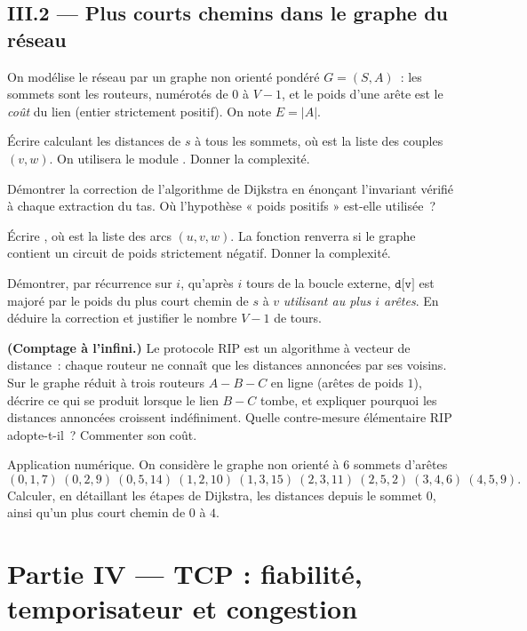 \documentclass[11pt,a4paper]{article}
\begin{document}
\subsection*{III.2 --- Plus courts chemins dans le graphe du réseau}

On modélise le réseau par un graphe non orienté pondéré $G=(S,A)$~: les sommets sont les
routeurs, numérotés de $0$ à $V-1$, et le poids d'une arête est le \emph{coût} du lien
(entier strictement positif). On note $E=|A|$.

\Q Écrire  calculant les distances de $s$ à tous les sommets, où
 est la liste des couples $(v,w)$. On utilisera le module . Donner
la complexité.

\Q Démontrer la correction de l'algorithme de Dijkstra en énonçant l'invariant vérifié à
chaque extraction du tas. Où l'hypothèse « poids positifs » est-elle utilisée~?

\Q Écrire , où  est la liste des arcs
$(u,v,w)$. La fonction renverra  si le graphe contient un circuit de poids
strictement négatif. Donner la complexité.

\Q Démontrer, par récurrence sur $i$, qu'après $i$ tours de la boucle externe,
$\texttt{d[v]}$ est majoré par le poids du plus court chemin de $s$ à $v$ \emph{utilisant au
plus $i$ arêtes}. En déduire la correction et justifier le nombre $V-1$ de tours.

\Q \textbf{(Comptage à l'infini.)} Le protocole RIP est un algorithme à vecteur de distance~:
chaque routeur ne connaît que les distances annoncées par ses voisins. Sur le graphe réduit
à trois routeurs $A - B - C$ en ligne (arêtes de poids $1$), décrire ce qui se produit
lorsque le lien $B-C$ tombe, et expliquer pourquoi les distances annoncées croissent
indéfiniment. Quelle contre-mesure élémentaire RIP adopte-t-il~? Commenter son coût.

\Q Application numérique. On considère le graphe non orienté à $6$ sommets d'arêtes
\[ (0,1,7)\ (0,2,9)\ (0,5,14)\ (1,2,10)\ (1,3,15)\ (2,3,11)\ (2,5,2)\ (3,4,6)\ (4,5,9). \]
Calculer, en détaillant les étapes de Dijkstra, les distances depuis le sommet $0$, ainsi
qu'un plus court chemin de $0$ à $4$.

\section*{Partie IV --- TCP : fiabilité, temporisateur et congestion}
\end{document}
